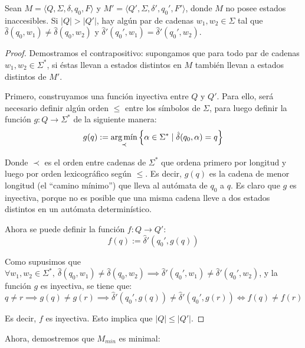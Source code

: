 \begin{lemma*}
    Sean $M = \langle Q, \Sigma, \delta, q_0, F \rangle$ y $M' = \langle Q', \Sigma, \delta', q_0', F' \rangle$, donde $M$ no posee estados inaccesibles. Si $|Q| > |Q'|$, hay algún par de cadenas $w_1, w_2 \in \Sigma$ tal que $\hat\delta(q_0, w_1) \neq \hat\delta(q_0, w_2)$ y $\hat\delta'(q_0', w_1) = \hat\delta'(q_0', w_2)$.
\end{lemma*}
\begin{proof}
    Demostramos el contrapositivo: supongamos que para todo par de cadenas $w_1, w_2 \in \Sigma^*$, si éstas llevan a estados distintos en $M$ también llevan a estados distintos de $M'$.

    Primero, construyamos una función inyectiva entre $Q$ y $Q'$. Para ello, será necesario definir algún orden $\leq$ entre los símbolos de $\Sigma$, para luego definir la función $g: Q \to \Sigma^*$ de la siguiente manera:
    $$
        g(q) := \argmin_{\prec} \left\{\alpha \in \Sigma^* \mid \hat\delta(q_0, \alpha) = q\right\}
    $$

    Donde $\prec$ es el orden entre cadenas de $\Sigma^*$ que ordena primero por longitud y luego por orden lexicográfico según $\leq$. Es decir, $g(q)$ es la cadena de menor longitud (el ``camino mínimo'') que lleva al autómata de $q_0$ a $q$. Es claro que $g$ es inyectiva, porque no es posible que una misma cadena lleve a dos estados distintos en un autómata determinístico.

    Ahora se puede definir la función $f: Q \to Q'$:
    $$
        f(q) := \hat\delta'(q_0', g(q))
    $$

    Como supusimos que $\forall w_1, w_2 \in \Sigma^*,\ \hat\delta(q_0, w_1) \neq \hat\delta(q_0, w_2) \implies \hat\delta'(q_0', w_1) \neq \hat\delta'(q_0', w_2)$, y la función $g$ es inyectiva, se tiene que:
    $$
        q \neq r \implies g(q) \neq g(r) \implies \hat\delta'(q_0', g(q)) \neq \hat\delta'(q_0', g(r)) \iff f(q) \neq f(r)
    $$

    Es decir, $f$ es inyectiva. Esto implica que $|Q| \leq |Q'|$.
\end{proof}

Ahora, demostremos que $M_{min}$ es minimal:


